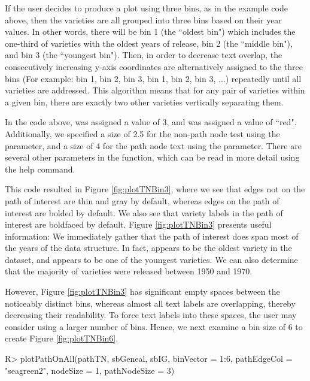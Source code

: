 \documentclass[article,shortnames]{jss}
\begin{document}
If the user decides to produce a plot using three bins, as in the example code above, then the varieties are all grouped into three bins based on their year values. In other words, there will be bin 1 (the ``oldest bin") which includes the one-third of varieties with the oldest years of release, bin 2 (the ``middle bin"), and bin 3 (the ``youngest bin"). Then, in order to decrease text overlap, the consecutively increasing y-axis coordinates are alternatively assigned to the three bins (For example: bin 1, bin 2, bin 3, bin 1, bin 2, bin 3, ...) repeatedly until all varieties are addressed. This algorithm means that for any pair of varieties within a given bin, there are exactly two other varieties vertically separating them.

In the code above,  was assigned a value of 3, and  was assigned a value of ``red". Additionally, we specified a size of 2.5 for the non-path node test using the  parameter, and a size of 4 for the path node text using the  parameter. There are several other parameters in the  function, which can be read in more detail using the help command.

This code resulted in Figure \ref{fig:plotTNBin3}, where we see that edges not on the path of interest are thin and gray by default, whereas edges on the path of interest are bolded by default. We also see that variety labels in the path of interest are boldfaced by default. Figure \ref{fig:plotTNBin3} presents useful information: We immediately gather that the path of interest does span most of the years of the data structure. In fact,  appears to be the oldest variety in the dataset, and  appears to be one of the youngest varieties. We can also determine that the majority of varieties were released between 1950 and 1970.

However, Figure \ref{fig:plotTNBin3} has significant empty spaces between the noticeably distinct bins, whereas almost all text labels are overlapping, thereby decreasing their readability. To force text labels into these spaces, the user may consider using a larger number of bins. Hence, we next examine a bin size of 6 to create Figure \ref{fig:plotTNBin6}.

\begin{Code}
R> plotPathOnAll(pathTN, sbGeneal, sbIG, binVector = 1:6, pathEdgeCol =
  "seagreen2", nodeSize = 1, pathNodeSize = 3)
\end{Code}
\end{document}
